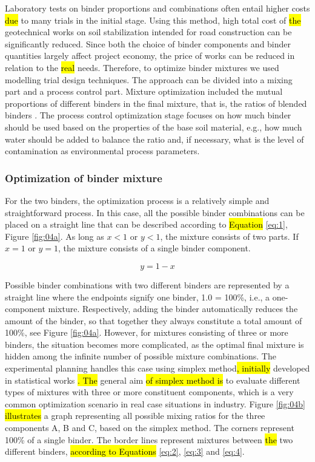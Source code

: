 \documentclass[materials,article,submit,pdftex,moreauthors]{Definitions/mdpi}
\begin{document}
Laboratory tests on binder proportions and combinations often entail\hl{ }higher costs\hl{ due} to many trials in the initial stage. Using this method, high total cost of \hl{the} geotechnical works on soil stabilization intended for road construction can be significantly reduced. Since both the choice of binder components and binder quantities largely affect project economy, the price of works can be reduced in relation to the \hl{real} needs. Therefore, to optimize binder mixtures we used modelling trial design techniques. The approach can be divided into a mixing part and a process control part. Mixture optimization included the mutual proportions of different binders in the final mixture, that is, the ratios of blended binders \cite{Lindh2001}. The process control optimization stage focuses on\hl{ }how much binder should be used based on the properties of the base soil material, e.g., how much water should be added to balance the ratio and, if necessary, what is the level of contamination as environmental process parameters.

\subsubsection{Optimization of binder mixture}
For the two binders, the optimization process is a relatively simple and straightforward process. In this case, all the possible binder combinations can be placed on a straight line that can be described according to \hl{Equation} \ref{eq:1}, Figure \ref{fig:04a}. As long as $x < 1$ or $y < 1$, the mixture consists of two parts. If $x=1$ or $y=1$, the mixture consists of a single binder component. 

\begin{equation}\label{eq:1}
y = 1 - x
\end{equation}

Possible binder combinations with two different binders are represented by a straight line where the endpoints signify one binder, 1.0 = 100\%, i.e., a one-component mixture. Respectively, adding the  binder automatically reduces the amount of the  binder, so that together they always constitute a total amount of 100\%, see Figure \ref{fig:04a}. However, for mixtures consisting of three or more binders, the situation becomes more complicated, as the optimal final mixture is hidden among the infinite number of possible mixture combinations. The experimental planning handles this case using simplex method\hl{, initially }developed in\hl{ }statistical works \citep{Montgomery,MyersMontgomery}\hl{. The }general aim \hl{of simplex method is} to evaluate different types of mixtures with three or more constituent components, which is a very common optimization scenario in real case situations in industry. Figure \ref{fig:04b} \hl{illustrates} a graph representing all possible mixing ratios for the three components A, B and C, based on the simplex method. The corners represent 100\% of a single binder. The border lines represent mixtures between \hl{the} two different binders, \hl{according to Equations} \ref{eq:2}, \ref{eq:3} and \ref{eq:4}. 
\end{document}

